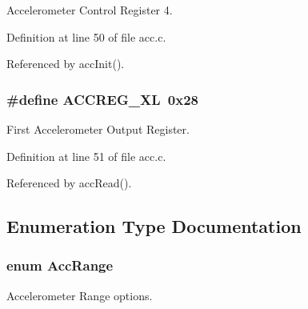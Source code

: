 Accelerometer Control Register 4. 



Definition at line 50 of file acc.\-c.



Referenced by acc\-Init().

\hypertarget{group__acc_ga9d03f89f2f3ef006967f84157a21075b}{
\subsubsection[{A\-C\-C\-R\-E\-G\-\_\-\-X\-L}]{\setlength{\rightskip}{0pt plus 5cm}\#define A\-C\-C\-R\-E\-G\-\_\-\-X\-L~0x28}}\label{group__acc_ga9d03f89f2f3ef006967f84157a21075b}


First Accelerometer Output Register. 



Definition at line 51 of file acc.\-c.



Referenced by acc\-Read().



\subsection{Enumeration Type Documentation}
\hypertarget{group__acc_ga3d56e56c162b045de727006a11880324}{
\subsubsection[{Acc\-Range}]{\setlength{\rightskip}{0pt plus 5cm}enum {\bf Acc\-Range}}}\label{group__acc_ga3d56e56c162b045de727006a11880324}


Accelerometer Range options. 

